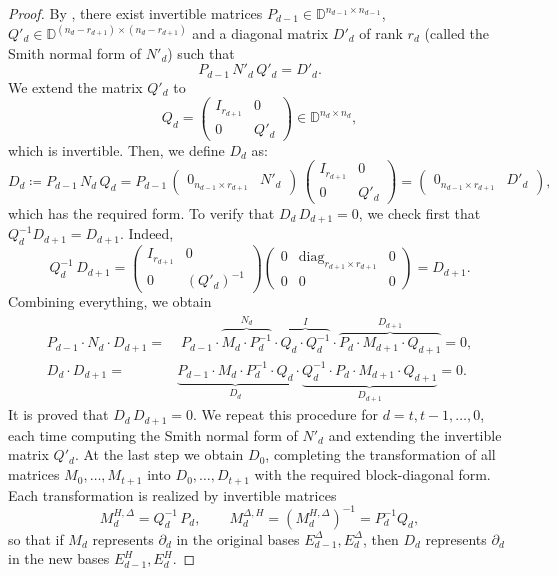\documentclass[a4paper,10pt]{article}
\newcommand{\bbd}{\mathbb{D}}
\newcommand{\mdh}{M^{\Delta,H}}
\newcommand{\mhd}{M^{H,\Delta}}
\begin{document}
\begin{proof}
By , there exist invertible matrices \(P_{d-1} \in \bbd^{n_{d-1} \times n_{d-1}}\), \(Q'_d \in \bbd^{(n_d - r_{d+1}) \times (n_d - r_{d+1})}\) and a diagonal matrix \(D'_d\) of rank \(r_d\) (called the Smith normal form of \(N'_d\)) such that
\[
P_{d-1} \, N'_d \, Q'_d = D'_d.
\]
We extend the matrix \(Q'_d\) to 
\[
Q_d = \begin{pmatrix} I_{r_{d+1}} & 0 \\ 0 & Q'_d \end{pmatrix} \in \bbd^{n_d \times n_d},
\]
which is invertible. Then, we define \(D_d\) as:
\[
D_d \coloneqq P_{d-1} \, N_d \, Q_d = P_{d-1} \, \begin{pmatrix} 0_{n_{d-1}\times r_{d+1}} & N'_d \end{pmatrix} \, \begin{pmatrix} I_{r_{d+1}} & 0 \\ 0 & Q'_d \end{pmatrix} = \begin{pmatrix} 0_{n_{d-1}\times r_{d+1}} & D'_d \end{pmatrix},
\]
which has the required form. To verify that \(D_d \, D_{d+1}=0\), we check first that \(Q^{-1}_d D_{d+1} = D_{d+1}\). Indeed,
\[
Q^{-1}_{d} \, D_{d+1}=
\begin{pmatrix} I_{r_{d+1}} & 0 \\ 0 & (Q'_{d})^{-1} \end{pmatrix}
\begin{pmatrix}
0 & \mathrm{diag}_{r_{d+1} \times r_{d+1}} & 0 \\
0 & 0 & 0
\end{pmatrix}
=
D_{d+1}.
\] 
Combining everything, we obtain
\begin{align*}
P_{d-1}\cdot N_{d}\cdot D_{d+1} = & \; 
P_{d-1} \cdot 
\overbrace{M_{d} \cdot P^{-1}_{d}}^{N_d}\cdot 
\overbrace{Q_{d} \cdot Q^{-1}_{d}}^{I} \cdot 
\overbrace{P_{d} \cdot M_{d+1} \cdot Q_{d+1}}^{D_{d+1}}
 = 0, \\
D_{d}\cdot D_{d+1} = & 
\underbrace{P_{d-1} \cdot M_{d} \cdot P^{-1}_{d} \cdot Q_{d}}_{D_d}  \cdot 
\underbrace{Q^{-1}_{d} \cdot P_{d} \cdot M_{d+1} \cdot Q_{d+1}}_{D_{d+1}}
 = 0.
\end{align*}
It is proved that \(D_d \, D_{d+1}=0\). We repeat this procedure for \(d = t, t-1, \dots, 0\), each time computing the Smith normal form of \(N'_d\) and extending the invertible matrix \(Q'_d\). At the last step we obtain \(D_0\), completing the transformation of all matrices \(M_0,\dots,M_{t+1}\) into \(D_0,\dots,D_{t+1}\) with the required block-diagonal form. Each transformation is realized by invertible matrices
\[
\mhd_d = Q_d^{-1} \, P_d, \qquad 
\mdh_d = (\mhd_d)^{-1} = P_d^{-1} Q_d,
\] 
so that if \(M_d\) represents \(\partial_d\) in the original bases \(E^\Delta_{d-1}, E^\Delta_d\), then \(D_d\) represents \(\partial_d\) in the new bases \(E^H_{d-1}, E^H_d\).
\end{proof}
\end{document}
